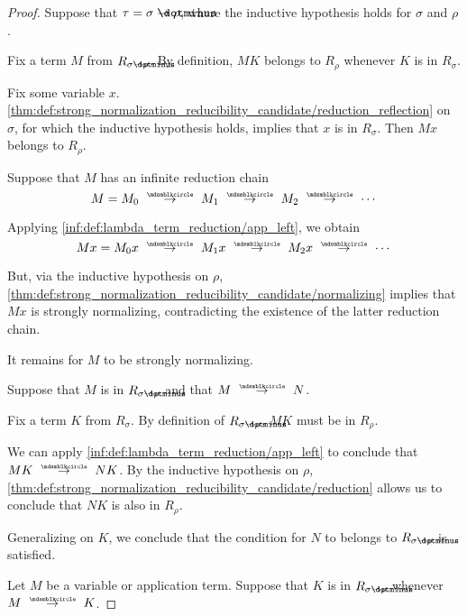 \begin{proof}
   Suppose that \( \tau = \sigma \synimplies \rho \), where the inductive hypothesis holds for \( \sigma \) and \( \rho \).

   Fix a term \( M \) from \( R_{\sigma \synimplies \rho} \). By definition, \( MK \) belongs to \( R_\rho \) whenever \( K \) is in \( R_\sigma \).

  Fix some variable \( x \). \ref{thm:def:strong_normalization_reducibility_candidate/reduction_reflection} on \( \sigma \), for which the inductive hypothesis holds, implies that \( x \) is in \( R_\sigma \). Then \( Mx \) belongs to \( R_\rho \).

  Suppose that \( M \) has an infinite reduction chain
  \begin{equation*}
    M = M_0 \pred M_1 \pred M_2 \pred \cdots
  \end{equation*}

  Applying \ref{inf:def:lambda_term_reduction/app_left}, we obtain
  \begin{equation*}
    Mx = M_0 x \pred M_1 x \pred M_2 x \pred \cdots
  \end{equation*}

  But, via the inductive hypothesis on \( \rho \), \ref{thm:def:strong_normalization_reducibility_candidate/normalizing} implies that \( Mx \) is strongly normalizing, contradicting the existence of the latter reduction chain.

  It remains for \( M \) to be strongly normalizing.

   Suppose that \( M \) is in \( R_{\sigma \synimplies \rho} \) and that \( M \pred N \).

  Fix a term \( K \) from \( R_\sigma \). By definition of \( R_{\sigma \synimplies \rho} \), \( MK \) must be in \( R_\rho \).

  We can apply \ref{inf:def:lambda_term_reduction/app_left} to conclude that \( MK \pred NK \). By the inductive hypothesis on \( \rho \), \ref{thm:def:strong_normalization_reducibility_candidate/reduction} allows us to conclude that \( NK \) is also in \( R_\rho \).

  Generalizing on \( K \), we conclude that the condition for \( N \) to belongs to \( R_{\sigma \synimplies \rho} \) is satisfied.

   Let \( M \) be a variable or application term. Suppose that \( K \) is in \( R_{\sigma \synimplies \rho} \) whenever \( M \pred K \).


\end{proof}
